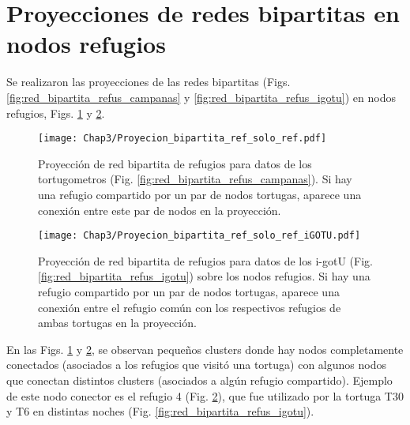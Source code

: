 \section{Proyecciones de redes bipartitas en nodos refugios}
Se realizaron las proyecciones de las redes bipartitas (Figs. \ref{fig:red_bipartita_refus_campanas} y \ref{fig:red_bipartita_refus_igotu}) en nodos refugios, Figs. \ref{fig:proyeccion_red_campanas_refus} y \ref{fig:proyeccion_red_igotu_refus}.
 
 
\begin{figure}[ht]
    \begin{center}
        \texttt{[image: Chap3/Proyecion\_bipartita\_ref\_solo\_ref.pdf]}
        \caption[Proyección  de red bipartita de refugios para datos de los tortugometros en nodos refugios.]{Proyección  de red bipartita de refugios para datos de los tortugometros (Fig. \ref{fig:red_bipartita_refus_campanas}). Si hay una refugio compartido por un par de nodos tortugas, aparece una conexión entre este par de nodos en la proyección. }
        \label{fig:proyeccion_red_campanas_refus}
       
        \end{center}
\end{figure}
 
\begin{figure}[ht]
    \begin{center}
        \texttt{[image: Chap3/Proyecion\_bipartita\_ref\_solo\_ref\_iGOTU.pdf]}
        \caption[Proyección  de red bipartita de refugios para datos de los i-gotU en nodos refugios.]{Proyección  de red bipartita de refugios para datos de los i-gotU (Fig. \ref{fig:red_bipartita_refus_igotu}) sobre los nodos refugios. Si hay una refugio compartido por un par de nodos tortugas, aparece una conexión entre el refugio común con los respectivos refugios de ambas tortugas en la proyección. }
        \label{fig:proyeccion_red_igotu_refus}
       
        \end{center}
\end{figure}
En las Figs. \ref{fig:proyeccion_red_campanas_refus} y \ref{fig:proyeccion_red_igotu_refus}, se observan pequeños clusters donde hay nodos completamente conectados (asociados a los refugios que visitó una tortuga) con algunos nodos que conectan distintos clusters (asociados a algún refugio compartido). Ejemplo de este nodo conector es el refugio 4 (Fig. \ref{fig:proyeccion_red_igotu_refus}), que fue utilizado por la tortuga T30 y T6 en distintas noches (Fig. \ref{fig:red_bipartita_refus_igotu}).
 
